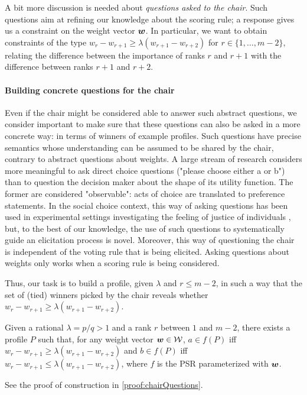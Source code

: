\documentclass{article}
\begin{document}
A bit more discussion is needed about {\em questions asked to the chair}.
Such questions aim at refining our knowledge about the scoring rule; a response gives us a constraint on the weight vector $\bm{w}$.
In particular, we want to obtain constraints of the type $w_{r} - w_{r+1} \geq \lambda (w_{r+1} - w_{r+2})$ for $r \in \{1,\ldots,m-2\}$, relating the difference between the importance of ranks $r$ and $r+1$ with the difference between ranks $r+1$ and $r+2$.

\paragraph{Building concrete questions for the chair}
Even if the chair might be considered able to answer such abstract questions, we consider important to make sure that these questions can also be asked in a more concrete way: in terms of winners of example profiles. Such questions have precise semantics whose understanding can be assumed to be shared by the chair, contrary to abstract questions about weights. A large stream of research considers more meaningful to ask direct choice questions ("please choose either a or b") than to question the decision maker about the shape of its utility function. The former are considered "observable": acts of choice are translated to preference statements. In the social choice context, this way of asking questions has been used in experimental settings investigating the feeling of justice of individuals \citep{Giritligil2005}, but, to the best of our knowledge, the use of such questions to systematically guide an elicitation process is novel. Moreover, this way of questioning the chair is independent of the voting rule that is being elicited. Asking questions about weights only works when a scoring rule is being considered.

Thus, our task is to build a profile, given $\lambda$ and $r ≤ m-2$, in such a way that the set of (tied) winners picked by the chair reveals whether $w_{r} - w_{r+1} \geq \lambda (w_{r+1} - w_{r+2})$.
\begin{proposition}\label{prop:chairQuestions}
	Given a rational $\lambda = p/q > 1$ and a rank $r$ between $1$ and $m - 2$, there exists a profile $P$ such that, for any weight vector $\bm{w} \in \mathcal{W}$, $a \in f(P)$ iff $w_{r} - w_{r+1} ≥ \lambda (w_{r+1} - w_{r+2})$ and $b \in f(P)$ iff $w_{r} - w_{r+1} ≤ \lambda (w_{r+1} - w_{r+2})$, where $f$ is the PSR parameterized with $\bm{w}$.
\end{proposition}
See the proof of construction in \cref{proof:chairQuestions}.
\end{document}
